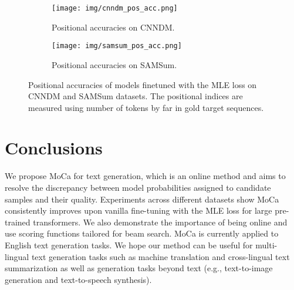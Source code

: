 \documentclass{article}
\begin{document}
\begin{figure}
     \centering
     \begin{subfigure}[b]{0.47\textwidth}
         \centering
         \texttt{[image: img/cnndm\_pos\_acc.png]}
         \caption{Positional accuracies on CNNDM.}
         \label{fig:pos_acc_cnndm}
     \end{subfigure}
     \hfill
     \begin{subfigure}[b]{0.47\textwidth}
         \centering
         \texttt{[image: img/samsum\_pos\_acc.png]}
         \caption{Positional accuracies on SAMSum.}
         \label{fig:pos_acc_samsum}
     \end{subfigure}
        \caption{Positional accuracies of models finetuned with the MLE loss on CNNDM and SAMSum datasets. The positional indices are measured using number of tokens by far in gold target sequences.}
        \label{fig:pos_acc}
\end{figure}


\section{Conclusions}
We propose MoCa for text generation, which is an online method and aims to resolve the discrepancy between model probabilities assigned to candidate samples and their quality. Experiments across different datasets show MoCa consistently improves upon vanilla fine-tuning with the MLE loss for large pre-trained transformers. We also demonstrate the importance of being online and use scoring functions tailored for beam search. MoCa is currently applied to English text generation tasks. We hope our method can be useful for multi-lingual text generation tasks such as machine translation and cross-lingual text summarization as well as generation tasks beyond text (e.g., text-to-image generation and text-to-speech synthesis). 



\end{document}
